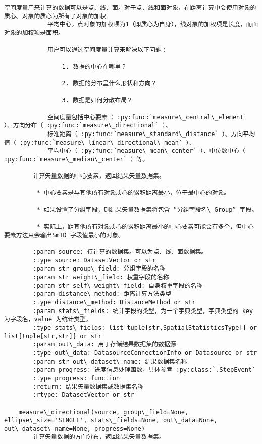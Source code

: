 \documentclass[11pt]{article}
\begin{document}
\begin{Verbatim}[commandchars=\\\{\}]
            空间度量用来计算的数据可以是点、线、面。对于点、线和面对象，在距离计算中会使用对象的质心。对象的质心为所有子对象的加权
            平均中心。点对象的加权项为1（即质心为自身），线对象的加权项是长度，而面对象的加权项是面积。
        
            用户可以通过空间度量计算来解决以下问题：
        
                1. 数据的中心在哪里？
        
                2. 数据的分布呈什么形状和方向？
        
                3. 数据是如何分散布局？
        
            空间度量包括中心要素（ :py:func:`measure\_central\_element` ）、方向分布（ :py:func:`measure\_directional` ）、
            标准距离（ :py:func:`measure\_standard\_distance` ）、方向平均值（ :py:func:`measure\_linear\_directional\_mean` ）、
            平均中心（ :py:func:`measure\_mean\_center` ）、中位数中心（ :py:func:`measure\_median\_center` ）等。
        
        计算矢量数据的中心要素，返回结果矢量数据集。
        
         * 中心要素是与其他所有对象质心的累积距离最小，位于最中心的对象。
        
         * 如果设置了分组字段，则结果矢量数据集将包含 “分组字段名\_Group” 字段。
        
         * 实际上，距其他所有对象质心的累积距离最小的中心要素可能会有多个，但中心要素方法只会输出SmID 字段值最小的对象。
        
        :param source: 待计算的数据集。可以为点、线、面数据集。
        :type source: DatasetVector or str
        :param str group\_field: 分组字段的名称
        :param str weight\_field: 权重字段的名称
        :param str self\_weight\_field: 自身权重字段的名称
        :param distance\_method: 距离计算方法类型
        :type distance\_method: DistanceMethod or str
        :param stats\_fields: 统计字段的类型，为一个字典类型，字典类型的 key 为字段名，value 为统计类型。
        :type stats\_fields: list[tuple[str,SpatialStatisticsType]] or list[tuple[str,str]] or str
        :param out\_data: 用于存储结果数据集的数据源
        :type out\_data: DatasourceConnectionInfo or Datasource or str
        :param str out\_dataset\_name: 结果数据集名称
        :param progress: 进度信息处理函数，具体参考 :py:class:`.StepEvent`
        :type progress: function
        :return: 结果矢量数据集或数据集名称
        :rtype: DatasetVector or str
    
    measure\_directional(source, group\_field=None, ellipse\_size='SINGLE', stats\_fields=None, out\_data=None, out\_dataset\_name=None, progress=None)
        计算矢量数据的方向分布，返回结果矢量数据集。
        

\end{Verbatim}
\end{document}
